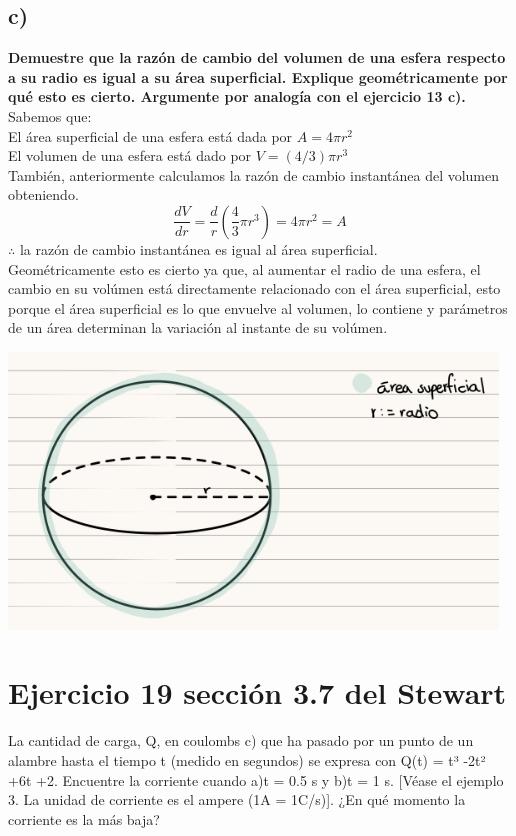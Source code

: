 \documentclass[11pt,letterpaper]{article}
\begin{document}
\subsection*{c)}
\textbf{Demuestre que la razón de cambio del volumen de una esfera respecto a su radio es igual a su área superficial. Explique geométricamente por qué esto es cierto. Argumente por analogía con el ejercicio 13 c).}\\
Sabemos que:\\
El área superficial de una esfera está dada por $A=4\pi r^2$\\
El volumen de una esfera está dado por $V=(4/3)\pi r^3$\\
También, anteriormente calculamos la razón de cambio instantánea del volumen obteniendo.
\begin{equation*}
  \frac{dV}{dr}=\frac{d}{r}\left(\frac{4}{3}\pi r^3 \right)=4\pi r^2=A
\end{equation*}
$\therefore$ la razón de cambio instantánea es igual al área superficial. \\
Geométricamente esto es cierto ya que, al aumentar el radio de una esfera, el cambio en su volúmen está directamente relacionado con el área superficial, esto porque el área superficial es lo que envuelve al volumen, lo contiene y parámetros de un área determinan la variación al instante de su volúmen.
\begin{center}
    \includegraphics[width=13cm]{./imagenes/celularadio.png}
\end{center}


\section*{Ejercicio 19 sección 3.7 del Stewart}
La cantidad de carga, Q, en coulombs c) que ha pasado por un punto de un alambre hasta el tiempo t (medido en segundos) se expresa con Q(t) = t³ -2t² +6t +2. Encuentre la corriente cuando a)t = 0.5 s y b)t = 1 s. [Véase el ejemplo 3. La unidad de corriente es el ampere
(1A = 1C/s)]. ¿En qué momento la corriente es la más baja?
\end{document}
